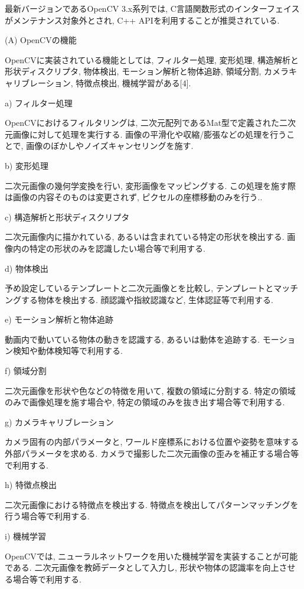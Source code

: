 最新バージョンであるOpenCV 3.x系列では, C言語関数形式のインターフェイスがメンテナンス対象外とされ, C++ APIを利用することが推奨されている.

\begin{description}
\item (A) OpenCVの機能

OpenCVに実装されている機能としては, フィルター処理, 変形処理, 構造解析と形状ディスクリプタ, 物体検出, モーション解析と物体追跡, 領域分割, カメラキャリブレーション, 特徴点検出, 機械学習がある[4].

\begin{description}
\item a) フィルター処理

OpenCVにおけるフィルタリングは, 二次元配列であるMat型で定義された二次元画像に対して処理を実行する.
画像の平滑化や収縮/膨張などの処理を行うことで, 画像のぼかしやノイズキャンセリングを施す.

\item b) 変形処理

二次元画像の幾何学変換を行い, 変形画像をマッピングする.
この処理を施す際は画像の内容そのものは変更されず, ピクセルの座標移動のみを行う..

\item c) 構造解析と形状ディスクリプタ

二次元画像内に描かれている, あるいは含まれている特定の形状を検出する.
画像内の特定の形状のみを認識したい場合等で利用する.

\item d) 物体検出

予め設定しているテンプレートと二次元画像とを比較し, テンプレートとマッチングする物体を検出する.
顔認識や指紋認識など, 生体認証等で利用する.

\item e) モーション解析と物体追跡

動画内で動いている物体の動きを認識する, あるいは動体を追跡する.
モーション検知や動体検知等で利用する.

\item f) 領域分割

二次元画像を形状や色などの特徴を用いて, 複数の領域に分割する.
特定の領域のみで画像処理を施す場合や, 特定の領域のみを抜き出す場合等で利用する.

\item g) カメラキャリブレーション

カメラ固有の内部パラメータと, ワールド座標系における位置や姿勢を意味する外部パラメータを求める.
カメラで撮影した二次元画像の歪みを補正する場合等で利用する.

\item h) 特徴点検出

二次元画像における特徴点を検出する.
特徴点を検出してパターンマッチングを行う場合等で利用する.

\item i) 機械学習

OpenCVでは, ニューラルネットワークを用いた機械学習を実装することが可能である.
二次元画像を教師データとして入力し, 形状や物体の認識率を向上させる場合等で利用する.
\end{description}

\end{description}

